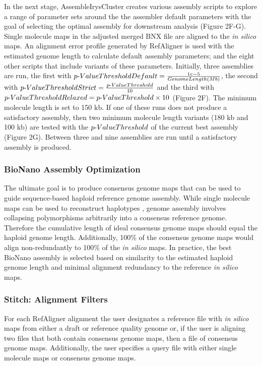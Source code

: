 \documentclass{bmcart}
\begin{document}
In the next stage, AssembleIrysCluster creates various assembly scripts to explore a range of parameter sets around the the assembler default parameters with the goal of selecting the optimal assembly for downstream analysis (Figure 2F-G). Single molecule maps in the adjusted merged BNX file are aligned to the \textit{in silico} maps. An alignment error profile generated by RefAligner is used with the estimated genome length to calculate default assembly parameters; and the eight other scripts that include variants of these parameters. Initially, three assemblies are run, the first with $p\textnormal{-}Value Threshold Default = \frac{1e-5}{Genome Length (Mb)}$, the second with  $p\textnormal{-}Value Threshold Strict = \frac{p\textnormal{-}Value Threshold}{10}$ and the third with $p\textnormal{-}Value Threshold Relaxed = {p\textnormal{-}Value Threshold} \times {10}$ (Figure 2F). The minimum molecule length is set to 150 kb. If one of these runs does not produce a satisfactory assembly, then two minimum molecule length variants (180 kb and 100 kb) are tested with the $p\textnormal{-}Value Threshold$ of the current best assembly (Figure 2G). Between three and nine assemblies are run until a satisfactory assembly is produced.

\subsubsection*{BioNano Assembly Optimization}


The ultimate goal is to produce consensus genome maps that can be used to guide sequence-based haploid reference genome assembly. While single molecule maps can be used to reconstruct haplotypes \cite{MHCLam}, genome assembly involves collapsing polymorphisms arbitrarily into a consensus reference genome. Therefore the cumulative length of ideal consensus genome maps should equal the haploid genome length. Additionally, 100\% of the consensus genome maps would align non-redundantly to 100\% of the \textit{in silico} maps. In practice, the best BioNano assembly is selected based on similarity to the estimated haploid genome length and minimal alignment redundancy to the reference \textit{in silico} maps.

\subsubsection*{Stitch: Alignment Filters}


For each RefAligner alignment the user designates a reference file with \textit{in silico} maps from either a draft or reference quality genome or, if the user is aligning two files that both contain consensus genome maps, then a file of consensus genome maps. Additionally, the user specifies a query file with either single molecule maps or consensus genome maps. 
\end{document}
